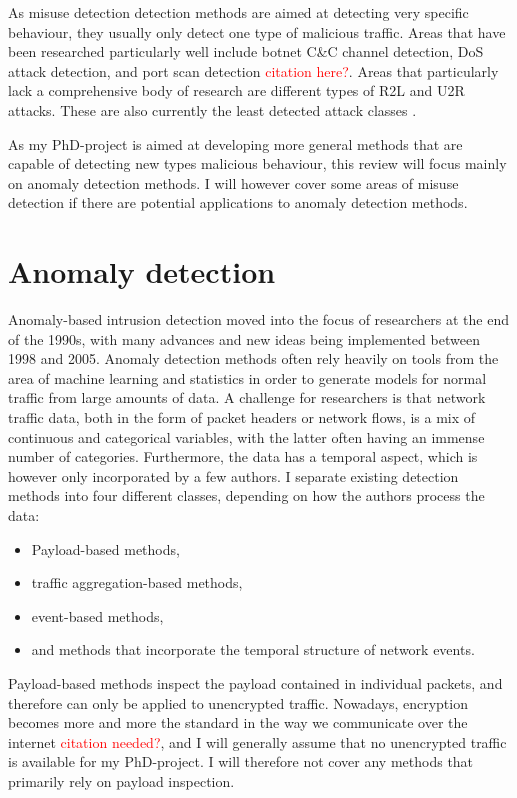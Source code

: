 \documentclass[a4paper,12pt,twoside]{report}
\begin{document}
As misuse detection detection methods are aimed at detecting very specific behaviour, they usually only detect one type of malicious traffic. Areas that have been researched particularly well include botnet C\&C channel detection, DoS attack detection, and port scan detection \textcolor{red}{citation here?}. Areas that particularly lack a comprehensive body of research are different types of R2L and U2R attacks. These are also currently the least   detected   attack   classes \cite{nisioti2018intrusion}.

As my PhD-project is aimed at developing more general methods that are capable of detecting new types malicious behaviour, this review will focus mainly on anomaly detection methods. I will however cover some areas of misuse detection if there are potential applications to anomaly detection methods.

\section{Anomaly detection}

Anomaly-based intrusion detection moved into the focus of researchers at the end of the 1990s, with many advances and new ideas being implemented between 1998 and 2005. Anomaly detection methods often rely heavily on tools from the area of machine learning and statistics in order to generate  models for normal traffic from large amounts of data. A challenge for researchers is that network traffic data, both in the form of packet headers or network flows, is a mix of continuous and categorical variables, with the latter often having an immense number of categories. Furthermore, the data has a temporal aspect, which is however only incorporated by a few authors. I separate existing detection methods into four different classes, depending on how the authors process the data: 

\begin{itemize}
\item Payload-based methods,
\item traffic aggregation-based methods,
\item event-based methods,
\item and methods that incorporate the temporal structure of network events.
\end{itemize}

Payload-based methods inspect the payload contained in individual packets, and therefore can only be applied to unencrypted traffic. Nowadays, encryption becomes more and more the standard in the way we communicate over the internet \textcolor{red}{citation needed?}, and I will generally assume that no unencrypted traffic is available for my PhD-project. I will therefore not cover any methods that primarily rely on payload inspection.
\end{document}

